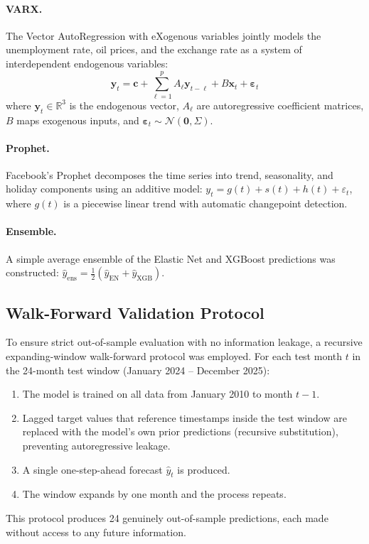 \documentclass[14pt, a4paper]{extarticle}
\begin{document}
\paragraph{VARX.}
The Vector AutoRegression with eXogenous variables jointly models the unemployment rate, oil prices, and the exchange rate as a system of interdependent endogenous variables:
\begin{equation}
    \mathbf{y}_t = \mathbf{c} + \sum_{\ell=1}^{p} A_\ell \mathbf{y}_{t-\ell} + B \mathbf{x}_t + \boldsymbol{\varepsilon}_t
    \label{eq:varx}
\end{equation}
where $\mathbf{y}_t \in \mathbb{R}^3$ is the endogenous vector, $A_\ell$ are autoregressive coefficient matrices, $B$ maps exogenous inputs, and $\boldsymbol{\varepsilon}_t \sim \mathcal{N}(\mathbf{0}, \Sigma)$.

\paragraph{Prophet.}
Facebook's Prophet decomposes the time series into trend, seasonality, and holiday components using an additive model: $y_t = g(t) + s(t) + h(t) + \varepsilon_t$, where $g(t)$ is a piecewise linear trend with automatic changepoint detection.

\paragraph{Ensemble.}
A simple average ensemble of the Elastic Net and XGBoost predictions was constructed: $\hat{y}_{\text{ens}} = \frac{1}{2}(\hat{y}_{\text{EN}} + \hat{y}_{\text{XGB}})$.

\subsection{Walk-Forward Validation Protocol}
To ensure strict out-of-sample evaluation with no information leakage, a recursive expanding-window walk-forward protocol was employed. For each test month $t$ in the 24-month test window (January 2024 -- December 2025):
\begin{enumerate}[nosep]
    \item The model is trained on all data from January 2010 to month $t-1$.
    \item Lagged target values that reference timestamps inside the test window are replaced with the model's own prior predictions (recursive substitution), preventing autoregressive leakage.
    \item A single one-step-ahead forecast $\hat{y}_t$ is produced.
    \item The window expands by one month and the process repeats.
\end{enumerate}
This protocol produces 24 genuinely out-of-sample predictions, each made without access to any future information.
\end{document}

